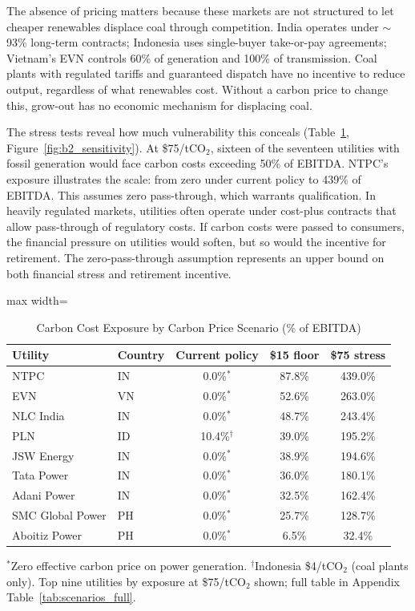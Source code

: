\documentclass[review,3p,authoryear]{elsarticle}
\begin{document}
The absence of pricing matters because these markets are not structured to let cheaper renewables displace coal through competition. India operates under $\sim$93\% long-term contracts; Indonesia uses single-buyer take-or-pay agreements; Vietnam's EVN controls 60\% of generation and 100\% of transmission. Coal plants with regulated tariffs and guaranteed dispatch have no incentive to reduce output, regardless of what renewables cost. Without a carbon price to change this, grow-out has no economic mechanism for displacing coal.

The stress tests reveal how much vulnerability this conceals (Table~\ref{tab:scenarios_new}, Figure~\ref{fig:b2_sensitivity}). At \$75/tCO$_2$, sixteen of the seventeen utilities with fossil generation would face carbon costs exceeding 50\% of EBITDA. NTPC's exposure illustrates the scale: from zero under current policy to 439\% of EBITDA. This assumes zero pass-through, which warrants qualification. In heavily regulated markets, utilities often operate under cost-plus contracts that allow pass-through of regulatory costs. If carbon costs were passed to consumers, the financial pressure on utilities would soften, but so would the incentive for retirement. The zero-pass-through assumption represents an upper bound on both financial stress and retirement incentive.

\begin{table}[H]
\centering
\caption{Carbon Cost Exposure by Carbon Price Scenario (\% of EBITDA)}
\label{tab:scenarios_new}
\begin{adjustbox}{max width=\linewidth}
\begin{tabular}{@{}llccc@{}}
\toprule
\textbf{Utility} & \textbf{Country} & \textbf{Current policy} & \textbf{\$15 floor} & \textbf{\$75 stress} \\
\midrule
NTPC & IN & 0.0\%$^{*}$ & 87.8\% & 439.0\% \\
EVN & VN & 0.0\%$^{*}$ & 52.6\% & 263.0\% \\
NLC India & IN & 0.0\%$^{*}$ & 48.7\% & 243.4\% \\
PLN & ID & 10.4\%$^{\dagger}$ & 39.0\% & 195.2\% \\
JSW Energy & IN & 0.0\%$^{*}$ & 38.9\% & 194.6\% \\
Tata Power & IN & 0.0\%$^{*}$ & 36.0\% & 180.1\% \\
Adani Power & IN & 0.0\%$^{*}$ & 32.5\% & 162.4\% \\
SMC Global Power & PH & 0.0\%$^{*}$ & 25.7\% & 128.7\% \\
Aboitiz Power & PH & 0.0\%$^{*}$ & 6.5\% & 32.4\% \\
\bottomrule
\end{tabular}
\end{adjustbox}
\begin{flushleft}
\footnotesize{$^{*}$Zero effective carbon price on power generation. $^{\dagger}$Indonesia \$4/tCO$_2$ (coal plants only). Top nine utilities by exposure at \$75/tCO$_2$ shown; full table in Appendix Table~\ref{tab:scenarios_full}.}
\end{flushleft}
\end{table}
\end{document}
